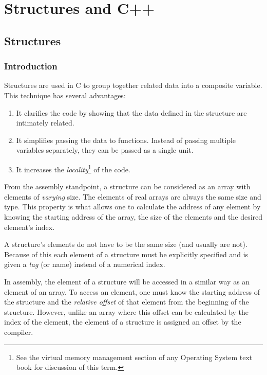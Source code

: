 \chapter{Structures and C++}

\section{Structures}

\subsection{Introduction}

Structures are used in C to group together related data into a composite 
variable. This technique has several advantages:
\begin{enumerate}
\item It clarifies the code by showing that the data defined in the structure
      are intimately related.
\item It simplifies passing the data to functions. Instead of passing
      multiple variables separately, they can be passed as a single unit.
\item It increases the \emph{locality}\footnote{See the virtual memory 
management section of any Operating System text book for discussion of
this term.} of the code.
\end{enumerate}

From the assembly standpoint, a structure can be considered as an
array with elements of \emph{varying} size. The elements of real
arrays are always the same size and type. This property is what allows
one to calculate the address of any element by knowing the starting
address of the array, the size of the elements and the desired
element's index.

A structure's elements do not have to be the same size (and usually
are not). Because of this each element of a structure must be
explicitly specified and is given a \emph{tag} (or name) instead of a
numerical index.

In assembly, the element of a structure will be accessed in a similar
way as an element of an array. To access an element, one must know the
starting address of the structure and the \emph{relative offset} of
that element from the beginning of the structure. However, unlike an
array where this offset can be calculated by the index of the element, 
the element of a structure is assigned an offset by the compiler.

